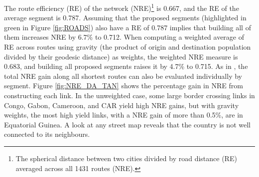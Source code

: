 \documentclass[a4paper]{article}
\begin{document}
The route efficiency (RE) of the network (NRE)\footnote{The spherical distance between two cities divided by road distance (RE) averaged across all 1431 routes (NRE).} is 0.667, and the RE of the average segment is 0.787. Assuming that the proposed segments (highlighted in green in Figure \ref{fig:ROADS}) also have a RE of 0.787 implies that building all of them increases NRE by 6.7\% to 0.712. When computing a weighted average of RE across routes using gravity (the product of origin and destination population divided by their geodesic distance) as weights, the weighted NRE measure is 0.683, and building all proposed segments raises it by 4.7\% to 0.715. As in \citet{krantz2024optimal}, the total NRE gain along all shortest routes can also be evaluated individually by segment. Figure \ref{fig:NRE_DA_TAN} shows the percentage gain in NRE from constructing each link. In the unweighted case, some large border crossing links in Congo, Gabon, Cameroon, and CAR yield high NRE gains, but with gravity weights, the most high yield links, with a NRE gain of more than 0.5\%, are in Equatorial Guinea. A look at any street map reveals that the country is not well connected to its neighbours.
\end{document}
